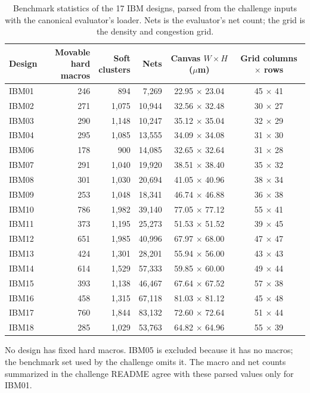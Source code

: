 \begin{table}[htbp]
\centering
\footnotesize
\caption{Benchmark statistics of the 17 IBM designs, parsed from the challenge inputs with the canonical evaluator's loader. Nets is the evaluator's net count; the grid is the density and congestion grid.}
\label{tab:benchmarks}
\begin{tabular}{lrrrcc}
\toprule
Design & \shortstack{Movable\\hard macros} & \shortstack{Soft\\clusters} & Nets & \shortstack{Canvas $W \times H$\\($\mu$m)} & \shortstack{Grid\\columns $\times$ rows} \\
\midrule
IBM01 & 246 & 894 & 7{,}269 & 22.95 $\times$ 23.04 & 45 $\times$ 41 \\
IBM02 & 271 & 1{,}075 & 10{,}944 & 32.56 $\times$ 32.48 & 30 $\times$ 27 \\
IBM03 & 290 & 1{,}148 & 10{,}247 & 35.12 $\times$ 35.04 & 32 $\times$ 29 \\
IBM04 & 295 & 1{,}085 & 13{,}555 & 34.09 $\times$ 34.08 & 31 $\times$ 30 \\
IBM06 & 178 & 900 & 14{,}085 & 32.65 $\times$ 32.64 & 31 $\times$ 28 \\
IBM07 & 291 & 1{,}040 & 19{,}920 & 38.51 $\times$ 38.40 & 35 $\times$ 32 \\
IBM08 & 301 & 1{,}030 & 20{,}694 & 41.05 $\times$ 40.96 & 38 $\times$ 34 \\
IBM09 & 253 & 1{,}048 & 18{,}341 & 46.74 $\times$ 46.88 & 36 $\times$ 38 \\
IBM10 & 786 & 1{,}982 & 39{,}140 & 77.05 $\times$ 77.12 & 55 $\times$ 41 \\
IBM11 & 373 & 1{,}195 & 25{,}273 & 51.53 $\times$ 51.52 & 39 $\times$ 45 \\
IBM12 & 651 & 1{,}985 & 40{,}996 & 67.97 $\times$ 68.00 & 47 $\times$ 47 \\
IBM13 & 424 & 1{,}301 & 28{,}201 & 55.94 $\times$ 56.00 & 43 $\times$ 43 \\
IBM14 & 614 & 1{,}529 & 57{,}333 & 59.85 $\times$ 60.00 & 49 $\times$ 44 \\
IBM15 & 393 & 1{,}138 & 46{,}467 & 67.64 $\times$ 67.52 & 57 $\times$ 38 \\
IBM16 & 458 & 1{,}315 & 67{,}118 & 81.03 $\times$ 81.12 & 45 $\times$ 48 \\
IBM17 & 760 & 1{,}844 & 83{,}132 & 72.60 $\times$ 72.64 & 51 $\times$ 44 \\
IBM18 & 285 & 1{,}029 & 53{,}763 & 64.82 $\times$ 64.96 & 55 $\times$ 39 \\
\bottomrule
\end{tabular}
\par\smallskip
\begin{minipage}{0.92\linewidth}\footnotesize No design has fixed hard macros. IBM05 is excluded because it has no macros; the benchmark set used by the challenge omits it. The macro and net counts summarized in the challenge README agree with these parsed values only for IBM01.\end{minipage}
\end{table}
